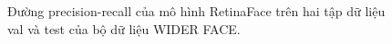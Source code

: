 {\begin{figure}[t]
        \caption{Đường precision-recall của mô hình RetinaFace trên hai tập dữ liệu val và test của bộ dữ liệu WIDER FACE.}
        \label{fig:wider-face}
    \end{figure}
}
